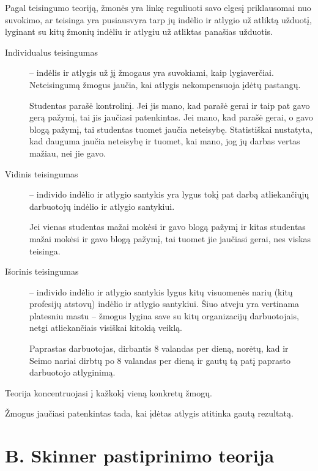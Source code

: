 Pagal teisingumo teoriją, žmonės yra linkę reguliuoti savo elgesį
priklausomai nuo suvokimo, ar teisinga yra pusiausvyra tarp jų indėlio
ir atlygio už atliktą užduotį, lyginant su kitų žmonių indėliu ir
atlygiu už atliktas panašias užduotis.

\begin{description}
  \item[Individualus teisingumas] – indėlis ir atlygis už jį žmogaus
    yra suvokiami, kaip lygiaverčiai. Neteisingumą žmogus jaučia,
    kai atlygis nekompensuoja įdėtų pastangų.
    \begin{exmp}
      Studentas parašė kontrolinį. Jei jis mano, kad parašė gerai ir
      taip pat gavo gerą pažymį, tai jis jaučiasi patenkintas. Jei
      mano, kad parašė gerai, o gavo blogą pažymį, tai studentas tuomet
      jaučia neteisybę. Statistiškai nustatyta, kad dauguma jaučia
      neteisybę ir tuomet, kai mano, jog jų darbas vertas mažiau, nei
      jie gavo.
    \end{exmp}
  \item[Vidinis teisingumas] – individo indėlio ir atlygio santykis yra
    lygus tokį pat darbą atliekančiųjų darbuotojų indėlio ir atlygio
    santykiui.
    \begin{exmp}
      Jei vienas studentas mažai mokėsi ir gavo blogą
      pažymį ir kitas studentas mažai mokėsi ir gavo blogą pažymį, tai
      tuomet jie jaučiasi gerai, nes viskas teisinga.
    \end{exmp}
  \item[Išorinis teisingumas] – individo indėlio ir atlygio santykis
    lygus kitų visuomenės narių (kitų profesijų atstovų) indėlio
    ir atlygio santykiui. Šiuo atveju yra vertinama platesniu mastu
    – žmogus lygina save su kitų organizacijų darbuotojais, netgi
    atliekančiais visiškai kitokią veiklą.
    \begin{exmp}
      Paprastas darbuotojas, dirbantis 8 valandas per dieną, norėtų, kad
      ir Seimo nariai dirbtų po 8 valandas per dieną ir gautų tą patį
      paprasto darbuotojo atlyginimą.
    \end{exmp}
\end{description}

Teorija koncentruojasi į kažkokį vieną konkretų žmogų.

Žmogus jaučiasi patenkintas tada, kai įdėtas atlygis atitinka gautą
rezultatą.

\section{B. Skinner pastiprinimo teorija}

